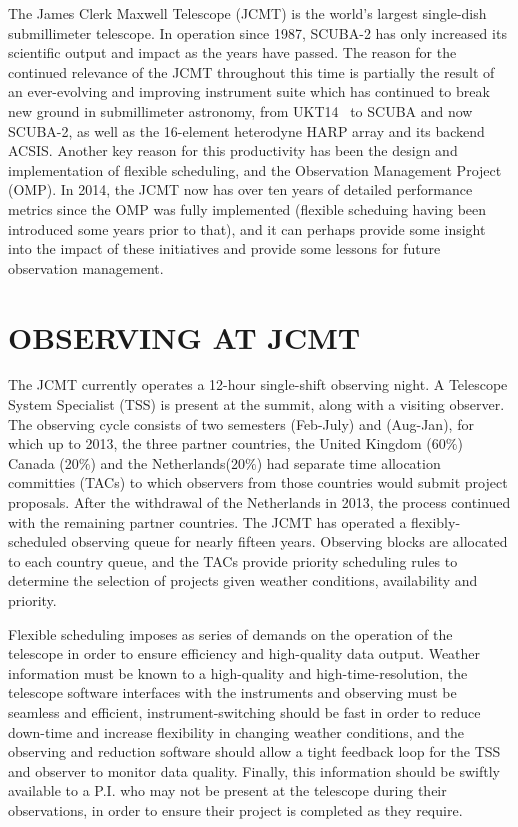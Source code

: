 \documentclass[]{spie}  %
\begin{document}
The James Clerk Maxwell Telescope (JCMT) is the world's largest
single-dish submillimeter telescope. In operation since 1987, SCUBA-2
has only increased its scientific output and impact as the years have
passed. The reason for the continued relevance of the JCMT throughout
this time is partially the result of an ever-evolving and improving
instrument suite which has continued to break new ground in
submillimeter astronomy, from UKT14~\cite{1990MNRAS.243..126D} to SCUBA \cite{holland1999}
and now SCUBA-2\cite{holland2013}, as well as the 16-element heterodyne
HARP array\cite{buckle} and its backend ACSIS\cite{2000SPIE.4015..114H}. Another key
reason for this productivity has been the design and implementation of
flexible scheduling\cite{tilanus2000,robson2002}, and the Observation
Management Project (OMP)\cite{economou2002}.  In 2014, the JCMT now
has over ten years of detailed performance metrics since the OMP was
fully implemented (flexible scheduing having been introduced some
years prior to that), and it can perhaps provide some insight into the
impact of these initiatives and provide some lessons for future
observation management.


\section{OBSERVING AT JCMT}

The JCMT currently operates a 12-hour single-shift observing night. A
Telescope System Specialist (TSS) is present at the summit, along with
a visiting observer. The observing cycle consists of two semesters
(Feb-July) and (Aug-Jan), for which up to 2013, the three partner
countries, the United Kingdom (60$\%$) Canada (20$\%$) and the
Netherlands(20$\%$) had separate time allocation committies (TACs) to
which observers from those countries would submit project
proposals. After the withdrawal of the Netherlands in 2013, the
process continued with the remaining partner countries. The JCMT has
operated a flexibly-scheduled observing queue for nearly fifteen
years. Observing blocks are allocated to each country queue, and the
TACs provide priority scheduling rules to determine the selection of
projects given weather conditions, availability and priority.

Flexible scheduling imposes as series of demands on the operation of
the telescope in order to ensure efficiency and high-quality data
output. Weather information must be known to a high-quality and
high-time-resolution, the telescope software interfaces with the
instruments and observing must be seamless and efficient,
instrument-switching should be fast in order to reduce down-time and
increase flexibility in changing weather conditions, and the observing
and reduction software should allow a tight feedback loop for the TSS
and observer to monitor data quality. Finally, this information should
be swiftly available to a P.I. who may not be present at the telescope
during their observations, in order to ensure their project is
completed as they require.
\end{document}
